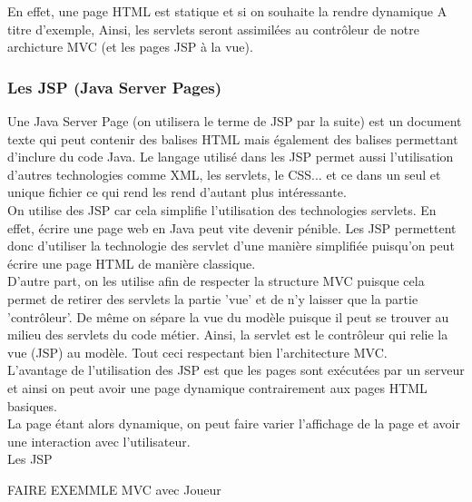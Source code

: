 En effet, une page HTML est statique et si on souhaite la rendre dynamique
A titre d'exemple, Ainsi, les servlets seront assimilées au contrôleur de notre
archicture MVC (et les pages JSP à la vue).\\

\subsubsection{Les JSP (Java Server Pages)}
Une Java Server Page (on utilisera le terme de JSP par la suite) est un document texte
qui peut contenir des balises HTML mais également des balises permettant d'inclure
du code Java. Le langage utilisé dans les JSP permet aussi l'utilisation d'autres
technologies comme XML, les servlets, le CSS... et ce dans un seul et unique fichier
ce qui rend les rend d'autant plus intéressante.\\

On utilise des JSP car cela simplifie l'utilisation des technologies servlets.
En effet, écrire une page web en Java peut vite devenir pénible. Les JSP permettent
donc d'utiliser la technologie des servlet d'une manière simplifiée puisqu'on peut
écrire une page HTML de manière classique.\\

D'autre part, on les utilise afin de respecter la structure MVC puisque cela permet
de retirer des servlets la partie 'vue' et de n'y laisser que la partie 'contrôleur'.
De même on sépare la vue du modèle puisque il peut se trouver au milieu des servlets
du code métier. Ainsi, la servlet est le contrôleur qui relie la vue (JSP) au modèle.
Tout ceci respectant bien l'architecture MVC.\\


L'avantage de l'utilisation des JSP est que les pages sont exécutées 
par un serveur et ainsi on peut avoir une page dynamique contrairement aux pages
HTML basiques.\\
La page étant alors dynamique, on peut faire varier l'affichage de la page et
avoir une interaction avec l'utilisateur.\\
Les JSP 

FAIRE EXEMMLE MVC avec Joueur




